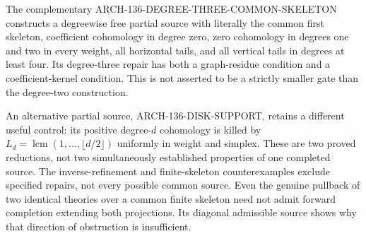 \documentclass[11pt,a4paper]{article}
\begin{document}
The complementary ARCH-136-DEGREE-THREE-COMMON-SKELETON constructs
a degreewise free partial source with literally the common first skeleton,
coefficient cohomology in degree zero, zero cohomology in degrees one and
two in every weight, all horizontal tails, and all vertical tails in
degrees at least four. Its degree-three repair has both a graph-residue
condition and a coefficient-kernel condition. This is not asserted to
be a strictly smaller gate than the degree-two construction.

An alternative partial source, ARCH-136-DISK-SUPPORT, retains a
different useful control: its positive degree-$d$ cohomology is killed
by $L_d=\operatorname{lcm}(1,\ldots,\lfloor d/2\rfloor)$ uniformly
in weight and simplex. These are two proved reductions, not two
simultaneously established properties of one completed source.
The inverse-refinement and finite-skeleton counterexamples exclude
specified repairs, not every possible common source. Even the genuine
pullback of two identical theories over a common finite skeleton need
not admit forward completion extending both projections. Its diagonal
admissible source shows why that direction of obstruction is insufficient.
\end{document}
